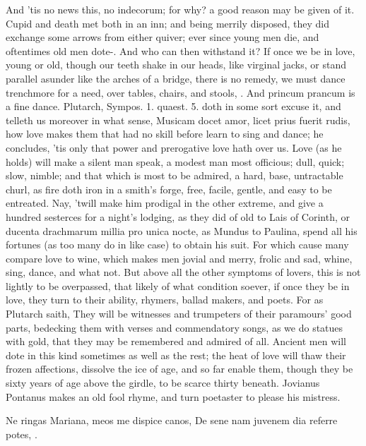 {And 'tis no news this, no indecorum; for why? a good reason may be
given of it. Cupid and death met both in an inn; and being merrily
disposed, they did exchange some arrows from either quiver; ever since
young men die, and oftentimes old men dote-. And who can then withstand it? If once we be in
love, young or old, though our teeth shake in our heads, like virginal
jacks, or stand parallel asunder like the arches of a bridge, there is
no remedy, we must dance trenchmore for a need, over tables, chairs,
and stools, \etc{}. And princum prancum is a fine dance. Plutarch, Sympos.
1. quaest. 5. doth in some sort excuse it, and telleth us moreover in
what sense, Musicam docet amor, licet prius fuerit rudis, how love
makes them that had no skill before learn to sing and dance; he
concludes, 'tis only that power and prerogative love hath over us.
Love (as he holds) will make a silent man speak, a modest man
most officious; dull, quick; slow, nimble; and that which is most to be
admired, a hard, base, untractable churl, as fire doth iron in a
smith's forge, free, facile, gentle, and easy to be entreated. Nay,
'twill make him prodigal in the other extreme, and give a hundred
sesterces for a night's lodging, as they did of old to Lais of Corinth,
or  ducenta drachmarum millia pro unica nocte, as Mundus to
Paulina, spend all his fortunes (as too many do in like case) to obtain
his suit. For which cause many compare love to wine, which makes men
jovial and merry, frolic and sad, whine, sing, dance, and what not.
But above all the other symptoms of lovers, this is not lightly to be
overpassed, that likely of what condition soever, if once they be in
love, they turn to their ability, rhymers, ballad makers, and poets.
For as Plutarch saith, They will be witnesses and trumpeters of
their paramours' good parts, bedecking them with verses and
commendatory songs, as we do statues with gold, that they may be
remembered and admired of all. Ancient men will dote in this kind
sometimes as well as the rest; the heat of love will thaw their frozen
affections, dissolve the ice of age, and so far enable them, though
they be sixty years of age above the girdle, to be scarce thirty
beneath. Jovianus Pontanus makes an old fool rhyme, and turn poetaster
to please his mistress.

Ne ringas Mariana, meos me dispice canos,
De sene nam juvenem dia referre potes, \etc{}.

}
